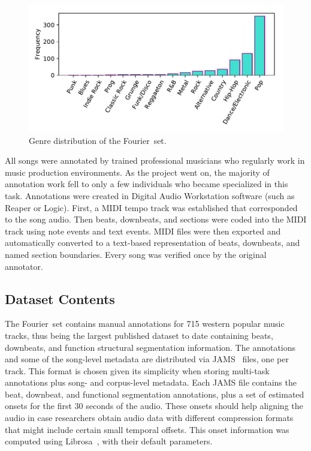 \documentclass{article}
\newcommand{\setName}{Fourier}
\begin{document}
\begin{figure}
    \centerline{\includegraphics[width=\columnwidth]{figs/PublishedGenres_distribution.pdf}}
    \caption{Genre distribution of the \setName~set.}
    \label{fig:genres_dist}
\end{figure}

All songs were annotated by trained professional musicians who regularly work in music production environments. As the project went on, the majority of annotation work fell to only a few individuals who became specialized in this task. Annotations were created in Digital Audio Workstation software (such as Reaper or Logic). First, a MIDI tempo track was established that corresponded to the song audio. Then beats, downbeats, and sections were coded into the MIDI track using note events and text events. MIDI files were then exported and automatically converted to a text-based representation of beats, downbeats, and named section boundaries. Every song was verified once by the original annotator.


\subsection{Dataset Contents}

The \setName~set contains manual annotations for 715 western popular music tracks, thus being the largest published  dataset to date containing beats, downbeats, and function structural segmentation information.
The annotations and some of the song-level metadata are distributed via JAMS~\cite{Humphrey2014} files, one per track.
This format is chosen given its simplicity when storing multi-task annotations plus song- and corpus-level metadata.
Each JAMS file contains the beat, downbeat, and functional segmentation annotations, plus a set of estimated onsets for the first 30 seconds of the audio.
These onsets should help aligning the audio in case researchers obtain audio data with different compression formats that might include certain small temporal offsets.
This onset information was computed using Librosa~\cite{Mcfee2015a}, with their default parameters.
\end{document}
